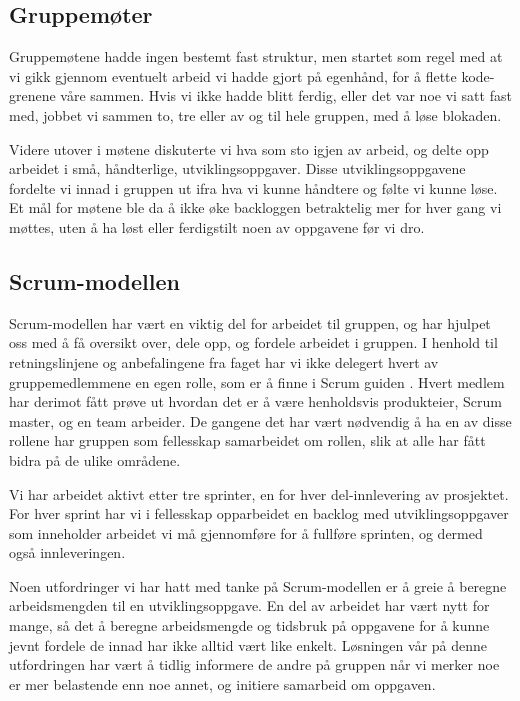 \documentclass[a4paper, 12pt]{article}  %
\begin{document}
\subsection{Gruppemøter}

Gruppemøtene hadde ingen bestemt fast struktur, men startet som regel med at vi gikk gjennom eventuelt arbeid vi hadde gjort på egenhånd, for å flette kode-grenene våre sammen.
Hvis vi ikke hadde blitt ferdig, eller det var noe vi satt fast med, jobbet vi sammen to, tre eller av og til hele gruppen, med å løse blokaden.

Videre utover i møtene diskuterte vi hva som sto igjen av arbeid, og delte opp arbeidet i små, håndterlige, utviklingsoppgaver.
Disse utviklingsoppgavene fordelte vi innad i gruppen ut ifra hva vi kunne håndtere og følte vi kunne løse.
Et mål for møtene ble da å ikke øke backloggen betraktelig mer for hver gang vi møttes, uten å ha løst eller ferdigstilt noen av oppgavene før vi dro.

\subsection{Scrum-modellen}

Scrum-modellen har vært en viktig del for arbeidet til gruppen, og har hjulpet oss med å få oversikt over, dele opp, og fordele arbeidet i gruppen.
I henhold til retningslinjene og anbefalingene fra faget har vi ikke delegert hvert av gruppemedlemmene en egen rolle, som er å finne i Scrum guiden \cite{scrum}.
Hvert medlem har derimot fått prøve ut hvordan det er å være henholdsvis produkteier, Scrum master, og en team arbeider.
De gangene det har vært nødvendig å ha en av disse rollene har gruppen som fellesskap samarbeidet om rollen, slik at alle har fått bidra på de ulike områdene.

Vi har arbeidet aktivt etter tre sprinter, en for hver del-innlevering av prosjektet.
For hver sprint har vi i fellesskap opparbeidet en backlog med utviklingsoppgaver som inneholder arbeidet vi må gjennomføre for å fullføre sprinten, og dermed også innleveringen.

Noen utfordringer vi har hatt med tanke på Scrum-modellen er å greie å beregne arbeidsmengden til en utviklingsoppgave.
En del av arbeidet har vært nytt for mange, så det å beregne arbeidsmengde og tidsbruk på oppgavene for å kunne jevnt fordele de innad har ikke alltid vært like enkelt.
Løsningen vår på denne utfordringen har vært å tidlig informere de andre på gruppen når vi merker noe er mer belastende enn noe annet, og initiere samarbeid om oppgaven.
\end{document}
